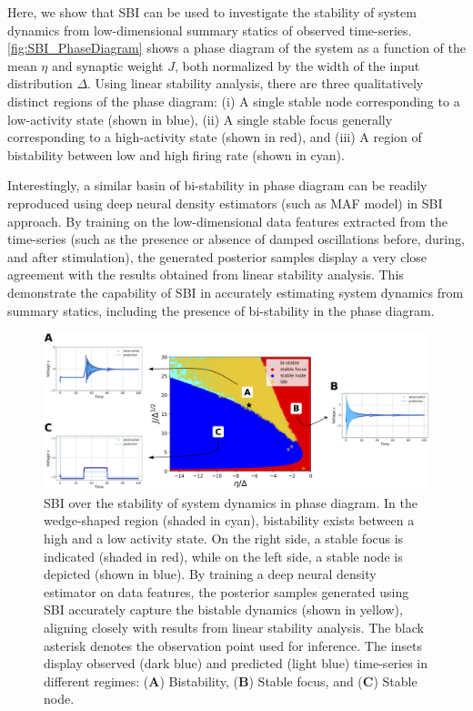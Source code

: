 \documentclass[preprint,11pt,authoryear]{elsarticle}
\begin{document}
Here, we show that SBI can be used to investigate the stability of system dynamics from low-dimensional summary statics of observed time-series. \autoref{fig:SBI_PhaseDiagram} shows a phase diagram of the system as a function of the mean $\eta$ and synaptic weight $J$, both normalized by the width of the input distribution $\Delta$. Using linear stability analysis, there are three qualitatively distinct regions of the phase diagram: (i) A single stable node corresponding to a low-activity state (shown in blue), (ii) A single stable focus generally corresponding to a high-activity state (shown in red), and (iii) A region of bistability between low and high firing rate (shown in cyan).  

Interestingly, a similar basin of bi-stability in phase diagram can be readily reproduced using deep neural density estimators (such as MAF model) in SBI approach. By training on the low-dimensional data features extracted from the time-series (such as the presence or absence of damped oscillations before, during, and after stimulation), the generated posterior samples display a very close agreement with the results obtained from linear stability analysis. This demonstrate the capability of SBI in accurately estimating system dynamics from summary statics, including the presence of bi-stability in the phase diagram.


 
\begin{figure}
    \centering
    \includegraphics[width=\linewidth]{Figs/Fig8.png}
    \caption{SBI over the stability of system dynamics in phase diagram. In the wedge-shaped region (shaded in cyan), bistability exists between a high and a low activity state. On the right side, a stable focus is indicated (shaded in red), while on the left side, a stable node is depicted (shown in blue). By training a deep neural density estimator on data features, the posterior samples generated using SBI accurately capture the bistable dynamics (shown in yellow), aligning closely with results from linear stability analysis. The black asterisk denotes the observation point used for inference. The insets display observed (dark blue) and predicted (light blue) time-series in different regimes: (\textbf{A}) Bistability, (\textbf{B}) Stable focus, and (\textbf{C}) Stable node.}
    \label{fig:SBI_PhaseDiagram}
\end{figure}
\end{document}
